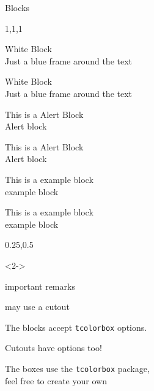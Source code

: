 \documentclass[english,aspectratio=169,t,9pt]{beamer}
\begin{document}
\begin{frame}{Blocks}
	\begin{cols}[1mm]{1,1,1}
		\begin{comsyswhiteblock}[sharp corners,equal height group=mygroup]
			White Block \\
			Just a blue frame around the text
		\end{comsyswhiteblock}
		\begin{comsyswhiteblock}[equal height group=mygroup]
			White Block \\
			Just a blue frame around the text
		\end{comsyswhiteblock}
		\col
		\begin{comsysredblock}[sharpish corners,equal height group=mygroup]
			This is a Alert Block \\
			Alert block
		\end{comsysredblock}
		\begin{comsysredblock}[equal height group=mygroup]
			This is a Alert Block \\
			Alert block
		\end{comsysredblock}
		\col
		\begin{comsysgreenblock}[sharp corners,equal height group=mygroup]
			This is a example block \\
			example block
		\end{comsysgreenblock}
		\begin{comsysgreenblock}[equal height group=mygroup]
			This is a example block \\
			example block
		\end{comsysgreenblock}
	\end{cols}
	\begin{cols}[2mm]{0.25,0.5}
		\begin{actionenv}<2-> %
		\begin{comsysredblock}%
			important remarks
		\end{comsysredblock}
		\end{actionenv}
		\begin{comsysyellowblock}[before skip=0pt]
			may use a cutout
		\end{comsysyellowblock}
		\col
		\begin{comsysredblock}[colback=RWTHblau,comsys/bottom cutout=0.7,comsys/bottom cutout dx=5mm,comsys/bottom cutout dy=3mm]
			The blocks accept \texttt{tcolorbox} options.
		\end{comsysredblock}
		\begin{comsysblueblock}[before skip=0pt]
			Cutouts have options too!
		\end{comsysblueblock}
		\begin{tcolorbox}[comsysboxbase,adjusted title=A Title,colframe=RWTHpetrol,coltitle=white]
			The boxes use the \texttt{tcolorbox} package, \\ feel free to create your own
		\end{tcolorbox}
	\end{cols}
\end{frame}
\end{document}
